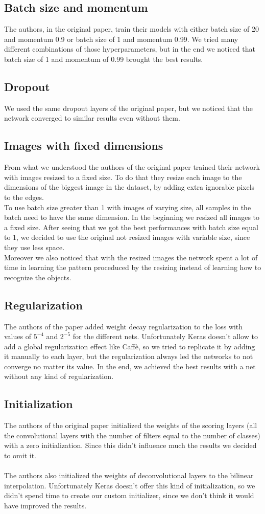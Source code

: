 \documentclass[10pt,twocolumn,letterpaper]{article}
\begin{document}
\subsection{Batch size and momentum}
The authors, in the original paper, train their models with either batch size of 20 and momentum 0.9 or batch size of 1 and momentum 0.99.
We tried many different combinations of those hyperparameters, but in the end we noticed that batch size of 1 and momentum of 0.99 brought the best results.
\subsection{Dropout}
We used the same dropout layers of the original paper, but we noticed that the network converged to similar results even without them.
\subsection{Images with fixed dimensions}
From what we understood the authors of the original paper trained their network with images resized to a fixed size. To do that they resize each image to the dimensions of the biggest image in the dataset, by adding extra ignorable pixels to the edges. \\
To use batch size greater than 1 with images of varying size, all samples in the batch need to have the same dimension. In the beginning we resized all images to a fixed size. After seeing that we got the best performances with batch size equal to 1, we decided to use the original not resized images with variable size, since they use less space. \\
Moreover we also noticed that with the resized images the network spent a lot of time in learning the pattern proceduced by the resizing instead of learning how to recognize the objects.
\subsection{Regularization}
The authors of the paper added weight decay regularization to the loss with values of $ 5^{-4}$ and $ 2^{-5}$ for the different nets. Unfortunately Keras doesn't allow to add a global regularization effect like Caffè, so we tried to replicate it by adding it manually to each layer, but the regularization always led the networks to not converge no matter its value.
In the end, we achieved the best results with a net without any kind of regularization.
\subsection{Initialization}
The authors of the original paper initialized the weights of the scoring layers (all the convolutional layers with the number of filters equal to the number of classes) with a zero initialization. Since this didn't influence much the results we decided to omit it. \\ \\
The authors also initialized the weights of deconvolutional layers to the bilinear interpolation. Unfortunately Keras doesn't offer this kind of initialization, so we didn't spend time to create our custom initializer, since we don't think it would have improved the results.
\end{document}
